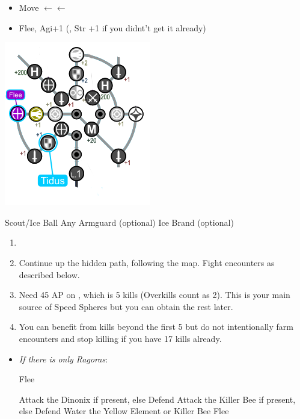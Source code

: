 \begin{spheregrid}
    \begin{itemize}
        \tidusf
        \begin{itemize}
            \item Move $\leftarrow\leftarrow$
            \item Flee, Agi+1 (, Str +1 if you didnt't get it already)
        \end{itemize}
    \end{itemize}
    \includegraphics{graphics/Tidus_Kilika}
\end{spheregrid}
\begin{equip}
    \begin{itemize}
        \wakkaf Scout/Ice Ball
        \wakkaf Any Armguard (optional)
        \tidusf Ice Brand (optional)
    \end{itemize}
\end{equip}
\begin{enumerate}[resume]
    \item \formation{\tidus}{\wakka}{\lulu}
    \item Continue up the hidden path, following the map. Fight encounters as described below.
    \item Need 45 AP on \tidus, which is 5 kills (Overkills count as 2). This is your main source of Speed Spheres but you can obtain the rest later.
    \item You can benefit from kills beyond the first 5 but do not intentionally farm encounters and stop killing if you have 17 kills already.
\end{enumerate}
\bothvfill\winvfill\lossvfill
\begin{encounters}
    \begin{itemize}
        \item \textit{If there is only Ragoras}:
            \begin{itemize}
                \tidusf Flee
            \end{itemize}
        \tidusf Attack the Dinonix if present, else Defend
        \wakkaf Attack the Killer Bee if present, else Defend
        \luluf Water the Yellow Element or Killer Bee
        \tidusf Flee
    \end{itemize}
\end{encounters}
